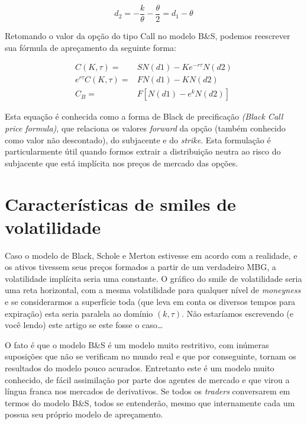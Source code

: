 \documentclass[]{book}
\begin{document}
\begin{equation}
d_{2}={-\frac{k}{\theta}-\frac{\theta}{2}}=d_1-\theta
\label{eq:d2mod}
\end{equation}

Retomando o valor da opção do tipo Call no modelo B\&S, podemos
reescrever sua fórmula de apreçamento da seguinte forma:

\begin{equation}
\begin{aligned}
C(K, \tau)=&SN(d1)-Ke^{-r\tau}N(d2)\\
e^{r\tau}C(K, \tau)=&FN(d1)-KN(d2)\\
C_B=&F\left[N(d1)-e^kN(d2)\right]
\end{aligned}
\label{eq:cblack}
\end{equation}

Esta equação é conhecida como a forma de Black de precificação
\emph{(Black Call price formula)}, que relaciona os valores
\emph{forward} da opção (também conhecido como valor não descontado), do
subjacente e do \emph{strike}. Esta formulação é particularmente útil
quando formos extrair a distribuição neutra ao risco do subjacente que
está implícita nos preços de mercado das opções.

\section{Características de smiles de volatilidade}\label{caracsmile}

Caso o modelo de Black, Schole e Merton estivesse em acordo com a
realidade, e os ativos tivessem seus preços formados a partir de um
verdadeiro MBG, a volatilidade implícita seria uma constante. O gráfico
do smile de volatilidade seria uma reta horizontal, com a mesma
volatilidade para qualquer nível de \emph{moneyness} e se considerarmos
a superfície toda (que leva em conta os diversos tempos para expiração)
esta seria paralela ao domínio \((k, \tau)\). Não estaríamos escrevendo
(e você lendo) este artigo se este fosse o caso\ldots{}

O fato é que o modelo B\&S é um modelo muito restritivo, com inúmeras
suposições que não se verificam no mundo real e que por conseguinte,
tornam os resultados do modelo pouco acurados. Entretanto este é um
modelo muito conhecido, de fácil assimilação por parte dos agentes de
mercado e que virou a língua franca nos mercados de derivativos. Se
todos os \emph{traders} conversarem em termos do modelo B\&S, todos se
entenderão, mesmo que internamente cada um possua seu próprio modelo de
apreçamento.
\end{document}
